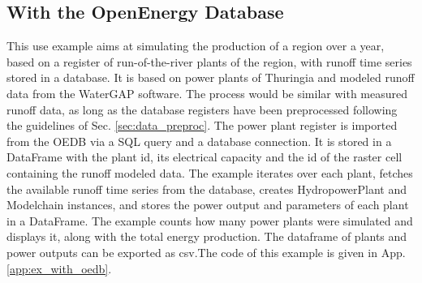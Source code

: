 \subsection{With the OpenEnergy Database}
\label{sub:ex_with_oedb}

This use example aims at simulating the production of a region over a year, based on a register of run-of-the-river plants of the region, with runoff time series stored in a database. It is based on power plants of Thuringia and modeled runoff data from the WaterGAP software. The process would be similar with measured runoff data, as long as the database registers have been preprocessed following the guidelines of Sec. \ref{sec:data_preproc}. \newline
The power plant register is imported from the OEDB via a SQL query and a database connection. It is stored in a DataFrame with the plant id, its electrical capacity and the id of the raster cell containing the runoff modeled data. The example iterates over each plant, fetches the available runoff time series from the database, creates HydropowerPlant and Modelchain instances, and stores the power output and parameters of each plant in a DataFrame. \newline
The example counts how many power plants were simulated and displays it, along with the total energy production. The dataframe of plants and power outputs can be exported as csv.The code of this example is given in App. \ref{app:ex_with_oedb}.
